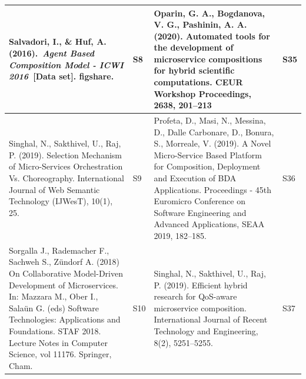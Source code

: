 \documentclass{article}
\begin{document}
\begin{appendices}
\begin{table}
\begin{center}
\begin{tabular}{ | m{20em} | m{1cm}| m{20em} | m{1cm} | }
Salvadori, I., \& Huf, A. (2016).~\textit{Agent Based Composition Model - ICWI 2016}~[Data set]. figshare.                                                                                                                                                                                                                                                & S8             & Oparin, G. A., Bogdanova, V. G.,  Pashinin, A. A. (2020). Automated tools for the development of microservice compositions for hybrid scientific computations. CEUR Workshop Proceedings, 2638, 201–213                                                                                                                                                                                                                        & S35             \\ 
\hline
Singhal, N., Sakthivel, U.,  Raj, P. (2019). Selection Mechanism of Micro-Services Orchestration Vs. Choreography. International Journal of Web  Semantic Technology (IJWesT), 10(1), 25.                                                                                                                                                                 & S9             & Profeta, D., Masi, N., Messina, D., Dalle Carbonare, D., Bonura, S.,  Morreale, V. (2019). A Novel Micro-Service Based Platform for Composition, Deployment and Execution of BDA Applications. Proceedings - 45th Euromicro Conference on Software Engineering and Advanced Applications, SEAA 2019, 182–185.                                                                                                                  & S36             \\ 
\hline
\textcolor[rgb]{0.2,0.2,0.2}{Sorgalla J., Rademacher F., Sachweh S., Zündorf A. (2018) On Collaborative Model-Driven Development of Microservices. In: Mazzara M., Ober I., Salaün G. (eds) Software Technologies: Applications and Foundations. STAF 2018. Lecture Notes in Computer Science, vol 11176. Springer, Cham.}                                & S10            & Singhal, N., Sakthivel, U.,  Raj, P. (2019). Efficient hybrid research for QoS-aware microservice composition. International Journal of Recent Technology and Engineering, 8(2), 5251–5255.                                                                                                                                                                                                                                    & S37             \\ 
\hline

\end{tabular}
\end{center}
\end{table}
\end{appendices}
\end{document}
